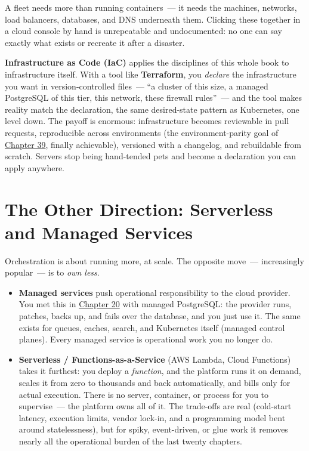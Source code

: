 A fleet needs more than running containers~--- it needs the machines, networks, load balancers, databases, and DNS underneath them. Clicking these together in a cloud console by hand is unrepeatable and undocumented: no one can say exactly what exists or recreate it after a disaster.

\textbf{Infrastructure as Code (IaC)} applies the disciplines of this whole book to infrastructure itself. With a tool like \textbf{Terraform}, you \emph{declare} the infrastructure you want in version-controlled files~--- ``a cluster of this size, a managed PostgreSQL of this tier, this network, these firewall rules''~--- and the tool makes reality match the declaration, the same desired-state pattern as Kubernetes, one level down. The payoff is enormous: infrastructure becomes reviewable in pull requests, reproducible across environments (the environment-parity goal of \hyperref[ch:39-local-vs-production]{Chapter 39}, finally achievable), versioned with a changelog, and rebuildable from scratch. Servers stop being hand-tended pets and become a declaration you can apply anywhere.

\setcounter{section}{3}
\section{The Other Direction: Serverless and Managed Services}\label{43-cloud-native-orchestration:434-the-other-direction-serverless-and-managed-services}

Orchestration is about running more, at scale. The opposite move~--- increasingly popular~--- is to \emph{own less}.

\begin{itemize}
\tightlist
\item
  \textbf{Managed services} push operational responsibility to the cloud provider. You met this in \hyperref[ch:20-server-fundamentals]{Chapter 20} with managed PostgreSQL: the provider runs, patches, backs up, and fails over the database, and you just use it. The same exists for queues, caches, search, and Kubernetes itself (managed control planes). Every managed service is operational work you no longer do.
\item
  \textbf{Serverless / Functions-as-a-Service} (AWS Lambda, Cloud Functions) takes it furthest: you deploy a \emph{function}, and the platform runs it on demand, scales it from zero to thousands and back automatically, and bills only for actual execution. There is no server, container, or process for you to supervise~--- the platform owns all of it. The trade-offs are real (cold-start latency, execution limits, vendor lock-in, and a programming model bent around statelessness), but for spiky, event-driven, or glue work it removes nearly all the operational burden of the last twenty chapters.
\end{itemize}

